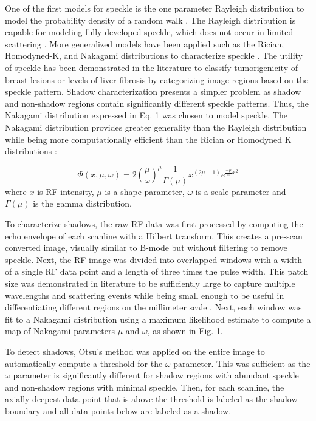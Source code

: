 \documentclass[authoryear,preprint,review,12pt]{elsarticle}
\begin{document}
One of the first models for speckle is the one parameter Rayleigh distribution to model the probability density of a random walk \citep{Burckhardt1978}. The Rayleigh distribution is capable for modeling fully developed speckle, which does not occur in limited scattering \citep{Tuthill1988}. More generalized models have been applied such as the Rician, Homodyned-K, and Nakagami distributions to characterize speckle \citep{Destrempes2010}. The utility of speckle has been demonstrated in the literature to classify tumorigenicity of breast lesions \citep{Byra2016} or levels of liver fibrosis \citep{Ho2012} by categorizing image regions based on the speckle pattern. Shadow characterization presents a simpler problem as shadow and non-shadow regions contain significantly different speckle patterns. Thus, the Nakagami distribution expressed in Eq. 1 was chosen to model speckle. The Nakagami distribution provides greater generality than the Rayleigh distribution while being more computationally efficient than the Rician or Homodyned K distributions \citep{Destrempes2010}:

\begin{equation}
\Phi(x,\mu,\omega) = 2(\frac{\mu}{\omega})^{\mu}\frac{1}{\Gamma(\mu)}x^{(2\mu-1)}e^{\frac{-\mu}{\omega}x^{2}}
\end{equation}where $x$ is RF intensity, $\mu$ is a shape parameter, $\omega$ is a scale parameter and $\Gamma(\mu)$ is the gamma distribution.

To characterize shadows, the raw RF data was first processed by computing the echo envelope of each scanline with a Hilbert transform. This creates a pre-scan converted image, visually similar to B-mode but without filtering to remove speckle. Next, the RF image was divided into overlapped windows with a width of a single RF data point and a length of three times the pulse width. This patch size was demonstrated in literature to be sufficiently large to capture multiple wavelengths and scattering events while being small enough to be useful in differentiating different regions on the millimeter scale \citep{Byra2016}. Next, each window was fit to a Nakagami distribution using a maximum likelihood estimate to compute a map of Nakagami parameters $\mu$ and $\omega$, as shown in Fig. 1.

To detect shadows, Otsu's method was applied on the entire image to automatically compute a threshold for the $\omega$ parameter. This was sufficient as the $\omega$ parameter is significantly different for shadow regions with abundant speckle and non-shadow regions with minimal speckle, Then, for each scanline, the axially deepest data point that is above the threshold is labeled as the shadow boundary and all data points below are labeled as a shadow.
\end{document}
